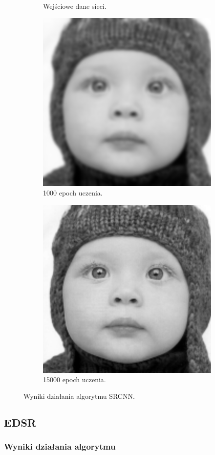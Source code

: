 \documentclass[a4paper,11pt, notitlepage ]{article}
\begin{document}
\begin{figure}[h!]
\begin{subfigure}[b]{0.4\linewidth}
	 		\caption{Wejściowe dane sieci.}
	 	\end{subfigure}
	 	\begin{subfigure}[b]{0.4\linewidth}
	 		\includegraphics[width=\linewidth]{SRCNN_1000.png}
	 		\caption{1000 epoch uczenia.}
	 	\end{subfigure}
	 	\begin{subfigure}[b]{0.4\linewidth}
	 		\includegraphics[width=\linewidth]{SRCNN_15000.png}
	 		\caption{15000 epoch uczenia.}
	 	\end{subfigure}
	 	\caption{Wyniki działania algorytmu SRCNN.}
	 	\label{fig:coffee3}
	 \end{figure}
 \subsection{EDSR}
 \subsubsection{Wyniki działania algorytmu}
\end{document}
